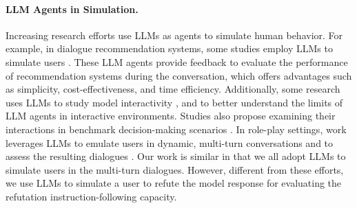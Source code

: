 
\paragraph*{LLM Agents in Simulation.}
Increasing research efforts use LLMs as agents to simulate human behavior. For example, in dialogue recommendation systems, some studies employ LLMs to simulate users \citep{bernard2024identifying,fang2024multi,wang2023rethinking}. These LLM agents provide feedback to evaluate the performance of recommendation systems during the conversation, which offers advantages such as simplicity, cost-effectiveness, and time efficiency. Additionally, some research uses LLMs to study model interactivity \citep{bang-etal-2023-multitask}, and to better understand the limits of LLM agents in interactive environments. Studies also propose examining their interactions in benchmark decision-making scenarios \citep{park2024llm}. In role-play settings, work leverages LLMs to emulate users in dynamic, multi-turn conversations and to assess the resulting dialogues \citep{gusev2024pingpong}. Our work is similar in that we all adopt LLMs to simulate users in the multi-turn dialogues. However, different from these efforts, we use LLMs to simulate a user to refute the model response for evaluating the refutation instruction-following capacity.

